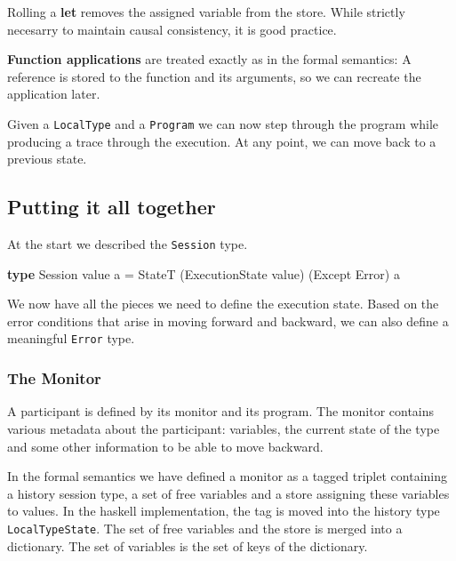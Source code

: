 \documentclass[runningheads]{llncs}
\newenvironment{Shaded}{}{}
\newcommand{\KeywordTok}[1]{\textcolor[rgb]{0.00,0.44,0.13}{\textbf{#1}}}
\newcommand{\DataTypeTok}[1]{\textcolor[rgb]{0.56,0.13,0.00}{#1}}
\newcommand{\FunctionTok}[1]{\textcolor[rgb]{0.02,0.16,0.49}{#1}}
\newcommand{\NormalTok}[1]{#1}
\begin{document}
Rolling a \textbf{let} removes the assigned variable from the store.
While strictly necesarry to maintain causal consistency, it is good
practice.

\textbf{Function applications} are treated exactly as in the formal
semantics: A reference is stored to the function and its arguments, so
we can recreate the application later.

Given a \texttt{LocalType} and a \texttt{Program} we can now step
through the program while producing a trace through the execution. At
any point, we can move back to a previous state.

\subsection{Putting it all together}\label{putting-it-all-together}

At the start we described the \texttt{Session} type.

\begin{Shaded}
\begin{Highlighting}[]
\KeywordTok{type} \DataTypeTok{Session}\NormalTok{ value a }\FunctionTok{=} \DataTypeTok{StateT}\NormalTok{ (}\DataTypeTok{ExecutionState}\NormalTok{ value) (}\DataTypeTok{Except} \DataTypeTok{Error}\NormalTok{) a}
\end{Highlighting}
\end{Shaded}

We now have all the pieces we need to define the execution state. Based
on the error conditions that arise in moving forward and backward, we
can also define a meaningful \texttt{Error} type.

\subsubsection{The Monitor}\label{the-monitor}

A participant is defined by its monitor and its program. The monitor
contains various metadata about the participant: variables, the current
state of the type and some other information to be able to move
backward.

In the formal semantics we have defined a monitor as a tagged triplet
containing a history session type, a set of free variables and a store
assigning these variables to values. In the haskell implementation, the
tag is moved into the history type \texttt{LocalTypeState}. The set of
free variables and the store is merged into a dictionary. The set of
variables is the set of keys of the dictionary.
\end{document}
